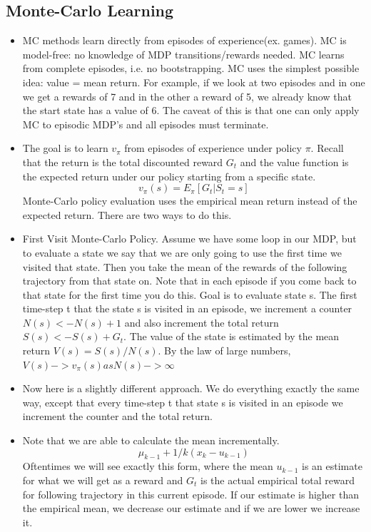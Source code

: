 \documentclass[a4paper]{article}
\begin{document}
\subsection{Monte-Carlo Learning}
\begin{itemize}
       \item MC methods learn directly from episodes of experience(ex. games). MC is model-free: no knowledge of MDP transitions/rewards needed. MC learns from complete episodes, i.e. no bootstrapping. MC uses the simplest possible idea: value = mean return. For example, if we look at two episodes and in one we get a rewards of 7 and in the other a reward of 5, we already know that the start state has a value of 6. The caveat of this is that one can only apply MC to episodic MDP's and all episodes must terminate. 
       \item The goal is to learn $v_{\pi}$ from episodes of experience under policy $\pi$. Recall that the return is the total discounted reward $G_t$ and the value function is the expected return under our policy starting from a specific state.$$ v_{\pi}(s) = E_{\pi}[G_t | S_t = s] $$ 
       Monte-Carlo policy evaluation uses the empirical mean return instead of the expected return. There are two ways to do this. 
       \item First Visit Monte-Carlo Policy. Assume we have some loop in our MDP, but to evaluate a state we say that we are only going to use the first time we visited that state. Then you take the mean of the rewards of the following trajectory from that state on. Note that in each episode if you come back to that state for the first time you do this.  \newline
       Goal is to evaluate state s. The first time-step t that the state s is visited in an episode, we increment a counter $N(s) <- N(s) + 1$ and also increment the total return $S(s) <- S(s) + G_t$. The value of the state is estimated by the mean return $V(s) = S(s) /N(s)$. By the law of large numbers, $ V(s) -> v_{\pi}(s) as N(s) -> \infty$
       \item Now here is a slightly different approach. We do everything exactly the same way, except that every time-step t that state s is visited in an episode we increment the counter and the total return.  
       \item Note that we are able to calculate the mean incrementally. $$\mu_{k-1} + 1/k(x_k - u_{k-1})$$ Oftentimes we will see exactly this form, where the mean $u_{k-1}$ is an estimate for what we will get as a reward and $G_t$ is the actual empirical total reward for following trajectory in this current episode. If our estimate is higher than the empirical mean, we decrease our estimate and if we are lower we increase it. 

\end{itemize}
\end{document}
